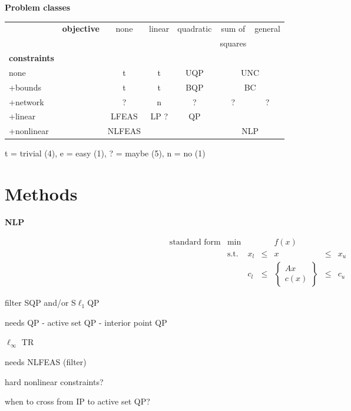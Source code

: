 \documentclass[twoside]{article}
\newcommand{\disp}[1]{\[{#1}\]}
\newcommand{\arr}[2]{\begin{array}{#1}#2\end{array}}
\newcommand{\alist}[2]{\begin{#1}{#2}\end{#1}}
\newcommand{\ilist}[1]{\alist{itemize}{#1}}
\newcommand{\header}[1]{\vspace{5mm}

\noindent
\textbf{\large {#1}}}
\begin{document}
\header{Problem classes}

\begin{center}
\begin{tabular}{|ll|c|c|c|c|c|}
\hline
           &  {\bf objective}
              &  none  &  linear  & quadratic & sum of  & general   \\
           &  &        &          &           & squares &           \\
{\bf  constraints}
           &  &        &          &           &         &           \\
\hline
none       &  &   t    &   t      &    UQP    & \multicolumn{2}{c|}{UNC}\\
\hline
+bounds    &  &   t    &   t      &    BQP    & \multicolumn{2}{c|}{BC}\\
\hline
+network   &  &   ?    &   n      &    ?      &    ?    &    ?        \\
\hline
+linear    &  &   LFEAS &   LP ?      &    QP      & \multicolumn{2}{c|}{}  \\
\cline{1-5}
+nonlinear &  &   NLFEAS    & \multicolumn{2}{c}{} & \multicolumn{2}{c|}{NLP} \\
\hline
\end{tabular}
\end{center}


\begin{center}
   t = trivial (4),
   e = easy    (1),
   ? = maybe   (5),
   n = no      (1)
\end{center}

\section{Methods}

\header{NLP}

\disp{\arr{rlccccc}{
   \mbox{standard form}   & \min        &     &      &  f(x) &      &     \\
                          & \mbox{s.t.} & x_l & \leq &    x  & \leq & x_u \\
                          &             & c_l & \leq &
                        \left\{ \begin{array}{c} Ax \\ c(x) \end{array} \right\}
                          & \leq & c_u}}

\ilist{
\item
   filter SQP and/or S$\ell_1$QP

\item
   needs QP
     - active set QP
     - interior point QP

\item
   $\ell_{\infty}$ TR

\item
   needs NLFEAS (filter)


\item
   hard nonlinear constraints?

\item
   when to cross from IP to active set QP?
}
\end{document}
